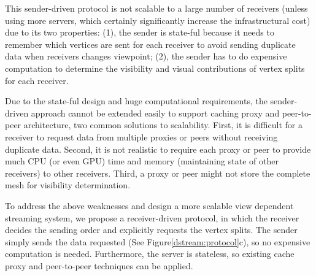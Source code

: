     This sender-driven protocol is not scalable to a large number 
    of receivers (unless using more servers, which certainly significantly
    increase the infrastructural cost) due to its two properties:
    (1), the sender is state-ful because it needs to remember which
    vertices are sent for each receiver to avoid sending duplicate data
    when receivers changes viewpoint;
    (2), the sender has to do expensive computation to determine the 
    visibility and visual contributions of vertex splits for each receiver.
    
    Due to the state-ful design and huge computational requirements,
    the sender-driven approach cannot be extended easily to support 
    caching proxy and peer-to-peer architecture, two common solutions to scalability. 
    First, it is difficult for a receiver to request data from multiple proxies or peers
    without receiving duplicate data.
    Second, it is not realistic to require each proxy or peer to provide much CPU (or even GPU) time
    and memory (maintaining state of other receivers) to other receivers. 
    Third, a proxy or peer might not store the complete mesh for visibility determination.

    To address the above weaknesses and design a more scalable view dependent streaming system, 
    we propose a receiver-driven protocol, 
    in which the receiver decides the sending order and explicitly requests
    the vertex splits. The sender simply sends the data requested 
    (See Figure\ref{dstream:protocol}c), so no expensive computation is needed.
    Furthermore, the server is stateless, so
    existing cache proxy and peer-to-peer techniques can be applied.

    \begin{comment}
    The receiver-driven protocol also reduces the size of data sent by the sender.
    In sender-driven protocols, for each vertex split, the sender has to send identifications
    to indicate which vertex to be split ($V_s$ in Figure \ref{f:intro:split2}),
    requiring at least $log_2{n}$ bits if $n$ vertices exist \cite{258843}. 
    In the receiver-driven protocol, however, the sender needs not send
    these identifications since the vertex splits can be sent according to
    the requesting order from the receiver. The identifications, sent
    by the receiver, consumes the down-link bandwidth 
    of the sender, which is often less likely to be the bottleneck than the up-link.
    \end{comment}

